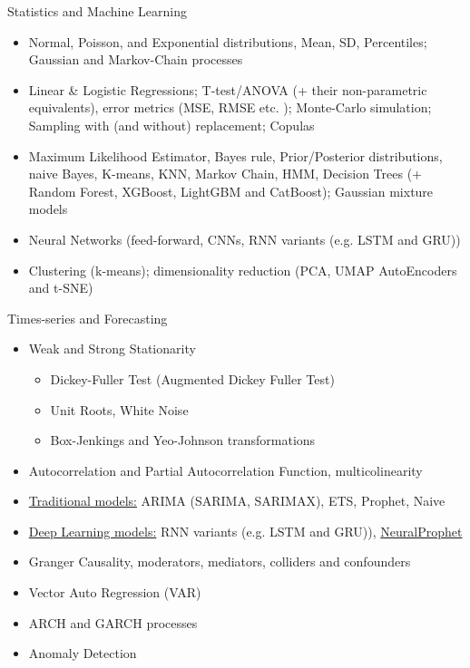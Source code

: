 \documentclass[compress,brown]{beamer}
\begin{document}
\begin{frame}{Statistics and Machine Learning}	

		\begin{itemize}
			\item Normal, Poisson, and Exponential distributions, Mean, SD, Percentiles; Gaussian and Markov-Chain processes
			\item Linear \& Logistic Regressions; T-test/ANOVA (+ their non-parametric equivalents), error metrics (MSE, RMSE etc. ); Monte-Carlo simulation; Sampling with (and without) replacement; Copulas
			\item Maximum Likelihood Estimator, Bayes rule, Prior/Posterior distributions, naive Bayes, K-means, KNN, Markov Chain, HMM, Decision Trees (+ Random Forest, XGBoost, LightGBM and CatBoost); Gaussian mixture models
			\item Neural Networks (feed-forward, CNNs, RNN variants (e.g. LSTM and GRU))
			\item Clustering (k-means); dimensionality reduction (PCA, UMAP AutoEncoders and t-SNE)
		\end{itemize}
	
\end{frame}

\begin{frame}{Times-series and Forecasting}	
	\begin{itemize}
	\item Weak and Strong Stationarity
	\begin{itemize}
		\item Dickey-Fuller Test (\plus Augmented Dickey Fuller Test)
		\item Unit Roots, White Noise
		\item Box-Jenkings and Yeo-Johnson transformations
	\end{itemize}
	\item Autocorrelation and Partial Autocorrelation Function, multicolinearity
	\item \underline{Traditional models:} ARIMA (SARIMA, SARIMAX), ETS, Prophet, Naive
	\item \underline{Deep Learning models:} RNN variants (e.g. LSTM and GRU)), \href{https://neuralprophet.com/html/index.html}{NeuralProphet}
	\item Granger Causality, moderators, mediators, colliders and confounders 
	\item Vector Auto Regression (VAR)
	\item ARCH and GARCH processes
	\item Anomaly Detection

\end{itemize}
	
\end{frame}
\end{document}
